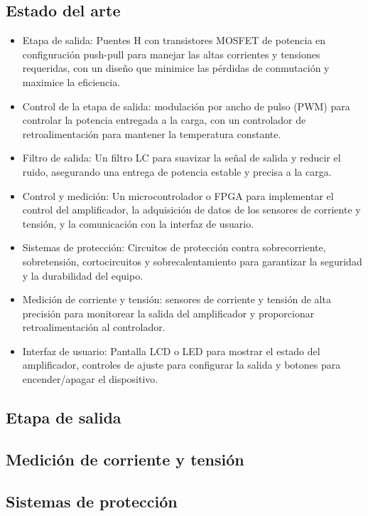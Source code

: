 {	\subsection{Estado del arte}
	\begin{itemize}
		\item Etapa de salida: Puentes H con transistores MOSFET de potencia en configuración push-pull para manejar las altas corrientes y tensiones requeridas, con un diseño que minimice las pérdidas de conmutación y maximice la eficiencia.
		\item Control de la etapa de salida: modulación por ancho de pulso (PWM) para controlar la potencia entregada a la carga, con un controlador de retroalimentación para mantener la temperatura constante.
		\item Filtro de salida: Un filtro LC para suavizar la señal de salida y reducir el ruido, asegurando una entrega de potencia estable y precisa a la carga.
		\item Control y medición: Un microcontrolador o FPGA para implementar el control del amplificador, la adquisición de datos de los sensores de corriente y tensión, y la comunicación con la interfaz de usuario.
		\item Sistemas de protección: Circuitos de protección contra sobrecorriente, sobretensión, cortocircuitos y sobrecalentamiento para garantizar la seguridad y la durabilidad del equipo.
		\item Medición de corriente y tensión: sensores de corriente y tensión de alta precisión para monitorear la salida del amplificador y proporcionar retroalimentación al controlador.
		\item Interfaz de usuario: Pantalla LCD o LED para mostrar el estado del amplificador, controles de ajuste para configurar la salida y botones para encender/apagar el dispositivo.
	\end{itemize}

	\subsection{Etapa de salida}

	\subsection{Medición de corriente y tensión}

	\subsection{Sistemas de protección}

}
